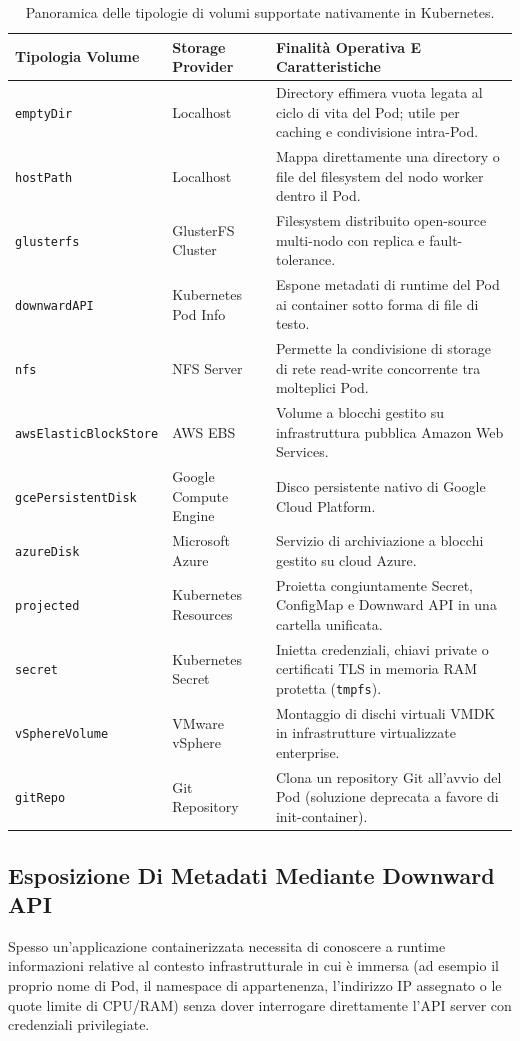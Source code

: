 \documentclass[11pt, a4paper]{article}
\begin{document}
\begin{table}[H]
\centering
\small
\renewcommand{\arraystretch}{1.2}
\begin{tabularx}{\textwidth}{l l X}
\toprule
\textbf{Tipologia Volume} & \textbf{Storage Provider} & \textbf{Finalità Operativa E Caratteristiche} \\
\midrule
\texttt{emptyDir} & Localhost & Directory effimera vuota legata al ciclo di vita del Pod; utile per caching e condivisione intra-Pod. \\
\texttt{hostPath} & Localhost & Mappa direttamente una directory o file del filesystem del nodo worker dentro il Pod. \\
\texttt{glusterfs} & GlusterFS Cluster & Filesystem distribuito open-source multi-nodo con replica e fault-tolerance. \\
\texttt{downwardAPI} & Kubernetes Pod Info & Espone metadati di runtime del Pod ai container sotto forma di file di testo. \\
\texttt{nfs} & NFS Server & Permette la condivisione di storage di rete read-write concorrente tra molteplici Pod. \\
\texttt{awsElasticBlockStore}& AWS EBS & Volume a blocchi gestito su infrastruttura pubblica Amazon Web Services. \\
\texttt{gcePersistentDisk} & Google Compute Engine & Disco persistente nativo di Google Cloud Platform. \\
\texttt{azureDisk} & Microsoft Azure & Servizio di archiviazione a blocchi gestito su cloud Azure. \\
\texttt{projected} & Kubernetes Resources & Proietta congiuntamente Secret, ConfigMap e Downward API in una cartella unificata. \\
\texttt{secret} & Kubernetes Secret & Inietta credenziali, chiavi private o certificati TLS in memoria RAM protetta (\texttt{tmpfs}). \\
\texttt{vSphereVolume} & VMware vSphere & Montaggio di dischi virtuali VMDK in infrastrutture virtualizzate enterprise. \\
\texttt{gitRepo} & Git Repository & Clona un repository Git all'avvio del Pod (soluzione deprecata a favore di init-container). \\
\bottomrule
\end{tabularx}
\caption{Panoramica delle tipologie di volumi supportate nativamente in Kubernetes.}
\label{tab:volume-types}
\end{table}

\subsection{Esposizione Di Metadati Mediante Downward API}
Spesso un'applicazione containerizzata necessita di conoscere a runtime informazioni relative al contesto infrastrutturale in cui è immersa (ad esempio il proprio nome di Pod, il namespace di appartenenza, l'indirizzo IP assegnato o le quote limite di CPU/RAM) senza dover interrogare direttamente l'API server con credenziali privilegiate.
\end{document}
